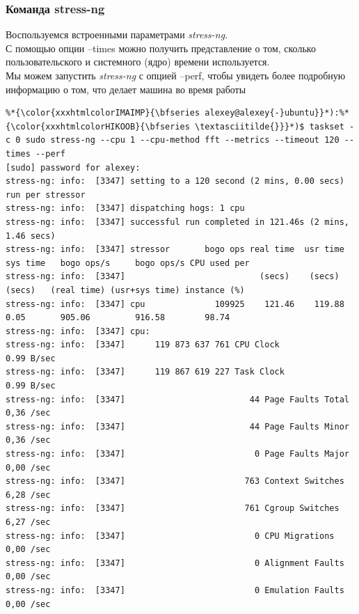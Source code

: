 \subsubsection{Команда stress-ng}
Воспользуемся встроенными параметрами \textit{stress-ng}.\\
С помощью опции --times можно получить представление о том, сколько пользовательского и системного (ядро) времени используется.\\
Мы можем запустить \textit{stress-ng} с опцией --perf, чтобы увидеть более подробную информацию о том, что делает машина во время работы\\
{\lstconsolestyle
{}
\begin{lstlisting}
%*{\color{xxxhtmlcolorIMAIMP}{\bfseries alexey@alexey{-}ubuntu}}*):%*{\color{xxxhtmlcolorHIKOOB}{\bfseries \textasciitilde{}}}*)$ taskset -c 0 sudo stress-ng --cpu 1 --cpu-method fft --metrics --timeout 120 --times --perf
[sudo] password for alexey: 
stress-ng: info:  [3347] setting to a 120 second (2 mins, 0.00 secs) run per stressor
stress-ng: info:  [3347] dispatching hogs: 1 cpu
stress-ng: info:  [3347] successful run completed in 121.46s (2 mins, 1.46 secs)
stress-ng: info:  [3347] stressor       bogo ops real time  usr time  sys time   bogo ops/s     bogo ops/s CPU used per
stress-ng: info:  [3347]                           (secs)    (secs)    (secs)   (real time) (usr+sys time) instance (%)
stress-ng: info:  [3347] cpu              109925    121.46    119.88      0.05       905.06         916.58        98.74
stress-ng: info:  [3347] cpu:
stress-ng: info:  [3347]      119 873 637 761 CPU Clock                       0.99 B/sec
stress-ng: info:  [3347]      119 867 619 227 Task Clock                      0.99 B/sec
stress-ng: info:  [3347]                         44 Page Faults Total               0,36 /sec 
stress-ng: info:  [3347]                         44 Page Faults Minor               0,36 /sec 
stress-ng: info:  [3347]                          0 Page Faults Major               0,00 /sec 
stress-ng: info:  [3347]                        763 Context Switches                6,28 /sec 
stress-ng: info:  [3347]                        761 Cgroup Switches                 6,27 /sec 
stress-ng: info:  [3347]                          0 CPU Migrations                  0,00 /sec 
stress-ng: info:  [3347]                          0 Alignment Faults                0,00 /sec 
stress-ng: info:  [3347]                          0 Emulation Faults                0,00 /sec 

\end{lstlisting}}
